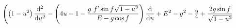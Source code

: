 \begin{equation}
\nonumber
\left( \left(1-u^2 \right) \frac{{\rm d}^2}{{\rm d}u^2} 
- \left(4 u -1 - \frac{g~f^\prime \sin f \sqrt{1-u^2}}{E - g \cos f}
\right)  \frac{{\rm d}}{{\rm d}u} 
+E^2 -g^2 - \tfrac{9}{4}
+\frac{2g \sin f}{\sqrt{1-u^2}} 
\right.  
\end{equation}


